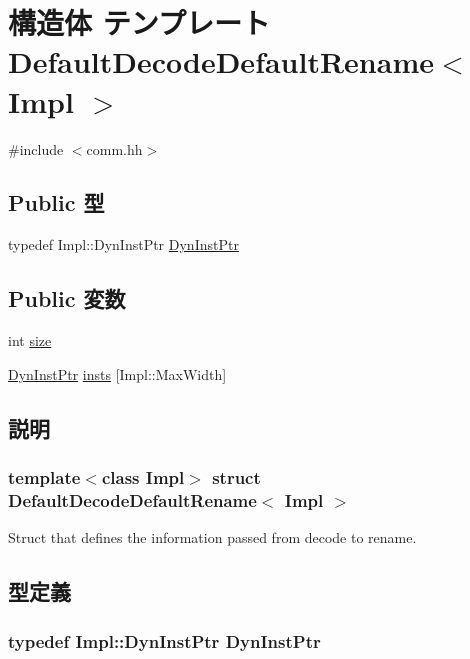 \hypertarget{structDefaultDecodeDefaultRename}{
\section{構造体 テンプレート DefaultDecodeDefaultRename$<$ Impl $>$}
\label{structDefaultDecodeDefaultRename}
}


{\ttfamily \#include $<$comm.hh$>$}\subsection*{Public 型}
\begin{DoxyCompactItemize}
\item 
typedef Impl::DynInstPtr \hyperlink{structDefaultDecodeDefaultRename_a028ce10889c5f6450239d9e9a7347976}{DynInstPtr}
\end{DoxyCompactItemize}
\subsection*{Public 変数}
\begin{DoxyCompactItemize}
\item 
int \hyperlink{structDefaultDecodeDefaultRename_a439227feff9d7f55384e8780cfc2eb82}{size}
\item 
\hyperlink{structDefaultDecodeDefaultRename_a028ce10889c5f6450239d9e9a7347976}{DynInstPtr} \hyperlink{structDefaultDecodeDefaultRename_a84958be72c3a0ec66109a9483e6c0331}{insts} \mbox{[}Impl::MaxWidth\mbox{]}
\end{DoxyCompactItemize}


\subsection{説明}
\subsubsection*{template$<$class Impl$>$ struct DefaultDecodeDefaultRename$<$ Impl $>$}

Struct that defines the information passed from decode to rename. 

\subsection{型定義}
\hypertarget{structDefaultDecodeDefaultRename_a028ce10889c5f6450239d9e9a7347976}{
\subsubsection[{DynInstPtr}]{\setlength{\rightskip}{0pt plus 5cm}typedef Impl::DynInstPtr {\bf DynInstPtr}}}
\label{structDefaultDecodeDefaultRename_a028ce10889c5f6450239d9e9a7347976}


